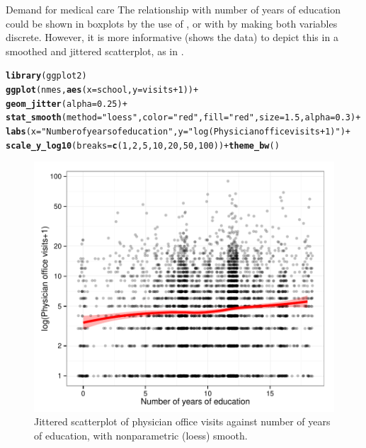 \documentclass[11pt]{book}\usepackage[]{graphicx}\usepackage[]{color}
\makeatletter
\newcommand{\hlnum}[1]{\textcolor[rgb]{0.686,0.059,0.569}{#1}}%
\newcommand{\hlstr}[1]{\textcolor[rgb]{0.192,0.494,0.8}{#1}}%
\newcommand{\hlopt}[1]{\textcolor[rgb]{0,0,0}{#1}}%
\newcommand{\hlstd}[1]{\textcolor[rgb]{0.345,0.345,0.345}{#1}}%
\newcommand{\hlkwc}[1]{\textcolor[rgb]{0.333,0.667,0.333}{#1}}%
\newcommand{\hlkwd}[1]{\textcolor[rgb]{0.737,0.353,0.396}{\textbf{#1}}}%
\newenvironment{kframe}{%
 \def\at@end@of@kframe{}%
 \ifinner\ifhmode%
  \def\at@end@of@kframe{\end{minipage}}%
  \begin{minipage}{\columnwidth}%
 \fi\fi%
 \def\FrameCommand##1{\hskip\@totalleftmargin \hskip-\fboxsep
 \colorbox{shadecolor}{##1}\hskip-\fboxsep
     \hskip-\linewidth \hskip-\@totalleftmargin \hskip\columnwidth}%
 \MakeFramed {\advance\hsize-\width
   \@totalleftmargin\z@ \linewidth\hsize
   \@setminipage}}%
 {\par\unskip\endMakeFramed%
 \at@end@of@kframe}
\newenvironment{knitrout}{}{} %
\renewenvironment{knitrout}{\small\renewcommand{\baselinestretch}{.85}}{} %
\makeatother
\begin{document}
\begin{Example}[nmes1]{Demand for medical care}
The relationship with number of years of education could be shown in boxplots by the use of
, or with  by making both variables discrete.
However, it is more informative (shows the data)
to depict this in a smoothed and jittered scatterplot,
as in .
\begin{knitrout}
\color{fgcolor}\begin{kframe}
\begin{alltt}
\hlkwd{library}\hlstd{(ggplot2)}
\hlkwd{ggplot}\hlstd{(nmes,} \hlkwd{aes}\hlstd{(}\hlkwc{x}\hlstd{=school,} \hlkwc{y}\hlstd{=visits}\hlopt{+}\hlnum{1}\hlstd{))} \hlopt{+}
  \hlkwd{geom_jitter}\hlstd{(}\hlkwc{alpha}\hlstd{=}\hlnum{0.25}\hlstd{)} \hlopt{+}
  \hlkwd{stat_smooth}\hlstd{(}\hlkwc{method}\hlstd{=}\hlstr{"loess"}\hlstd{,} \hlkwc{color}\hlstd{=}\hlstr{"red"}\hlstd{,} \hlkwc{fill}\hlstd{=}\hlstr{"red"}\hlstd{,} \hlkwc{size}\hlstd{=}\hlnum{1.5}\hlstd{,} \hlkwc{alpha}\hlstd{=}\hlnum{0.3}\hlstd{)} \hlopt{+}
  \hlkwd{labs}\hlstd{(}\hlkwc{x}\hlstd{=}\hlstr{"Number of years of education"}\hlstd{,} \hlkwc{y}\hlstd{=}\hlstr{"log(Physician office visits+1)"}\hlstd{)} \hlopt{+}
  \hlkwd{scale_y_log10}\hlstd{(}\hlkwc{breaks}\hlstd{=}\hlkwd{c}\hlstd{(}\hlnum{1}\hlstd{,}\hlnum{2}\hlstd{,}\hlnum{5}\hlstd{,}\hlnum{10}\hlstd{,}\hlnum{20}\hlstd{,}\hlnum{50}\hlstd{,}\hlnum{100}\hlstd{))} \hlopt{+} \hlkwd{theme_bw}\hlstd{()}
\end{alltt}
\end{kframe}\begin{figure}[!htbp]

\centerline{\includegraphics[width=.6\textwidth]{ch09/fig/nmes-school-1} }

\caption[Jittered scatterplot of physician office visits against number of years of education, with nonparametric (loess) smooth]{Jittered scatterplot of physician office visits against number of years of education, with nonparametric (loess) smooth.\label{fig:nmes-school}}
\end{figure}



\end{knitrout}
\end{Example}
\end{document}
